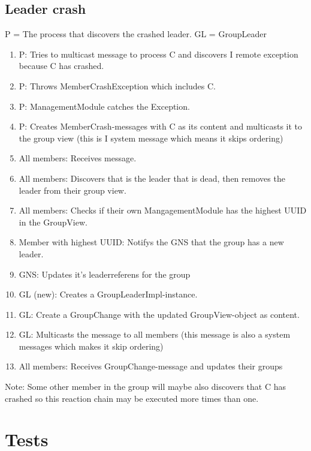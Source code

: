 \documentclass[titlepage, twocolumn, a4paper, 10pt]{article}
\begin{document}
\subsection{Leader crash}
P = The process that discovers the crashed leader. GL = GroupLeader
\begin{enumerate}
\item P: Tries to multicast message to process C and discovers I
  remote exception because C has crashed.
\item P: Throws MemberCrashException which includes C.
\item P: ManagementModule catches the Exception.
\item P: Creates MemberCrash-messages with C as its content and
  multicasts it to the group view (this is I system message which
  means it skips ordering)
\item All members: Receives message.
\item All members: Discovers that is the leader that is dead, then
  removes the leader from their group view.
\item All members: Checks if their own MangagementModule has the
  highest UUID in the GroupView.
\item Member with highest UUID: Notifys the GNS that the group has a new leader.
\item GNS: Updates it’s leaderreferens for the group
\item GL (new): Creates a GroupLeaderImpl-instance.
\item GL: Create a GroupChange with the updated GroupView-object as content.
\item GL: Multicasts the message to all members (this message is also
  a system messages which makes it skip ordering)
\item All members: Receives GroupChange-message and updates their groups
\end{enumerate}
Note: Some other member in the group will maybe also discovers that C
has crashed so this reaction chain may be executed more times than
one.



\section{Tests}\label{sec:tests}

\end{document}
